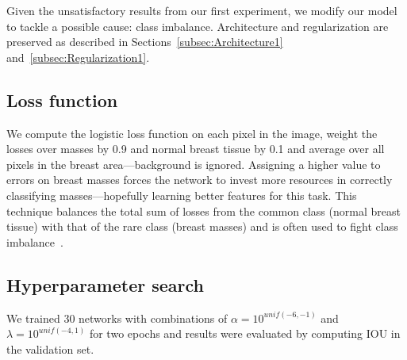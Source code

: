 Given the unsatisfactory results from our first experiment, we modify our model to tackle a possible cause: class imbalance. Architecture and regularization are preserved as described in Sections~\ref{subsec:Architecture1} and~\ref{subsec:Regularization1}.

\subsection{Loss function}
\label{subsec:LossFunction2}
We compute the logistic loss function on each pixel in the image, weight the losses over masses by 0.9 and normal breast tissue by 0.1 and average over all pixels in the breast area---background is ignored. Assigning a higher value to errors on breast masses forces the network to invest more resources in correctly classifying masses---hopefully learning better features for this task.
This technique balances the total sum of losses from the common class (normal breast tissue) with that of the rare class (breast masses) and is often used to fight class imbalance~\cite{Provost2000}.

\subsection{Hyperparameter search}
We trained 30 networks with combinations of $\alpha = 10^{unif(-6, -1)}$ and $\lambda = 10^{unif(-4, 1)}$ for two epochs and results were evaluated by computing IOU in the validation set.
